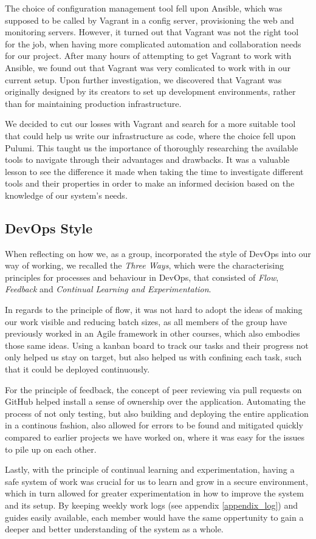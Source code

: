 The choice of configuration management tool fell upon Ansible, which was supposed to be called by Vagrant in a config server, provisioning the web and monitoring servers.
However, it turned out that Vagrant was not the right tool for the job, when having more complicated automation and collaboration needs for our project.
After many hours of attempting to get Vagrant to work with Ansible, we found out that Vagrant was very comlicated to work with in our current setup\cite{issue178-vagrant-ansible}. Upon further investigation, we discovered that Vagrant was originally designed by its creators to set up development environments, rather than for maintaining production infrastructure\cite{vagrant_vs_terraform}.

We decided to cut our losses with Vagrant and search for a more suitable tool that could help us write our infrastructure as code, where the choice fell upon Pulumi.
This taught us the importance of thoroughly researching the available tools to navigate through their advantages and drawbacks.
It was a valuable lesson to see the difference it made when taking the time to investigate different tools and their properties in order to make an informed decision based on the knowledge of our system's needs.

\subsection{DevOps Style}
When reflecting on how we, as a group, incorporated the style of DevOps into our way of working, we recalled the \textit{Three Ways}, which were the characterising principles for processes and behaviour in DevOps, that consisted of \textit{Flow}, \textit{Feedback} and \textit{Continual Learning and Experimentation}\cite{devopshandbook}.

In regards to the principle of flow, it was not hard to adopt the ideas of making our work visible and reducing batch sizes, as all members of the group have previously worked in an Agile framework in other courses, which also embodies those same ideas. Using a kanban board to track our tasks and their progress not only helped us stay on target, but also helped us with confining each task, such that it could be deployed continuously\cite{devopshandbook}.

For the principle of feedback, the concept of peer reviewing via pull requests on GitHub helped install a sense of ownership over the application. Automating the process of not only testing, but also building and deploying the entire application in a continous fashion, also allowed for errors to be found and mitigated quickly compared to earlier projects we have worked on, where it was easy for the issues to pile up on each other.

Lastly, with the principle of continual learning and experimentation, having a safe system of work\cite{devopshandbook} was crucial for us to learn and grow in a secure environment, which in turn allowed for greater experimentation in how to improve the system and its setup. By keeping weekly work logs (see appendix \ref{appendix_log}) and guides easily available, each member would have the same oppertunity to gain a deeper and better understanding of the system as a whole.
